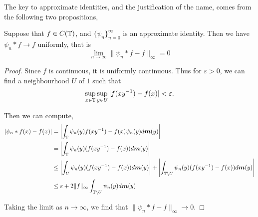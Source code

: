 \documentclass{owmaths}
\begin{document}
The key to approximate identities, and the justification
of the name, comes from the following two propositions, 
\begin{proposition}
    Suppose that $f \in C(\mathbb{T})$, and $\{\psi_n\}_{n=0}^\infty$ is an 
    approximate identity. Then we have $\psi_n * f\rightarrow f$
    uniformly, that is
    \begin{equation*}
        \lim_{n\rightarrow\infty}\|\psi_n*f-f\|_\infty = 0
    \end{equation*}
\end{proposition}
\begin{proof}
    Since $f$ is continuous, it is uniformly continuous. Thus for
    $\varepsilon > 0$, we can find a neighbourhood $U$ of $1$
    such that
    \begin{equation*}
        \sup_{x \in \mathbb{T}} \sup_{y \in U} |f(xy^{-1})-f(x)| < \varepsilon.
    \end{equation*}
    
    Then we can compute,
    \begin{align*}
        |\psi_n * f(x) - f(x)| &= \left|\int_{\mathbb{T}} \psi_n(y)f(xy^{-1})-f(x)\psi_n(y) d\boldsymbol{m}(y)\right|\\
        &= \left| \int_{\mathbb{T}} \psi_n(y)(f(xy^{-1})-f(x)) d\boldsymbol{m}(y)\right|\\
        &\leq \left| \int_{U} \psi_n(y)(f(xy^{-1})-f(x))d\boldsymbol{m}(y)\right| + \left|\int_{\mathbb{T}\setminus U} \psi_n(y)(f(xy^{-1})-f(x))d\boldsymbol{m}(y)\right|\\
        &\leq \varepsilon + 2\|f\|_\infty \int_{\mathbb{T}\setminus U}\psi_n(y)d\boldsymbol{m}(y)
    \end{align*}
    
    Taking the limit as $n\rightarrow\infty$, we find that $\|\psi_n*f-f\|_\infty\rightarrow 0$.
\end{proof}
\end{document}
